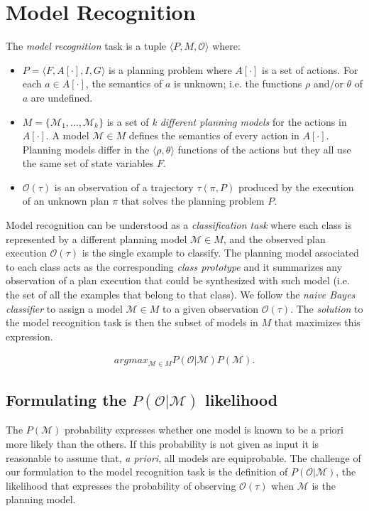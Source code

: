 \documentclass[letterpaper]{article} %
\newcommand{\tup}[1]{{\langle #1 \rangle}}
\begin{document}
\section{Model Recognition}
\label{sec:recognition}
The {\em model recognition} task is a tuple $\tup{P,M,\mathcal{O}}$ where:
\begin{itemize}
\item $P=\tup{F,A[\cdot],I,G}$ is a planning problem where $A[\cdot]$ is a set of actions. For each $a\in A[\cdot]$, the semantics of $a$ is unknown; i.e. the functions $\rho$ and/or $\theta$ of $a$ are undefined.
\item $M=\{\mathcal{M}_1,\ldots,\mathcal{M}_k\}$ is a set of {\em k different planning models} for the actions in $A[\cdot]$. A model $\mathcal{M}\in M$ defines the semantics of every action in $A[\cdot]$. Planning models differ in the $\tup{\rho,\theta}$ functions of the actions but they all use the same set of state variables $F$.
\item $\mathcal{O}(\tau)$ is an observation of a trajectory $\tau(\pi,P)$ produced by the execution of an unknown plan $\pi$ that solves the planning problem $P$.
\end{itemize}

Model recognition can be understood as a {\em classification task} where each class is represented by a different planning model $\mathcal{M}\in M$, and the observed plan execution $\mathcal{O}(\tau)$ is the single example to classify. The planning model associated to each class acts as the corresponding {\em class prototype} and it summarizes any observation of a plan execution that could be synthesized with such model (i.e. the set of all the examples that belong to that class). We follow the {\em naive Bayes classifier} to assign a model $\mathcal{M}\in M$ to a given observation $\mathcal{O}(\tau)$. The {\em solution} to the model recognition task is then the subset of models in $M$ that maximizes this expression.

\begin{align}
argmax_{\mathcal{M}\in M} P(\mathcal{O}|\mathcal{M}) P(\mathcal{M}).
\end{align}

\subsection{Formulating the $P(\mathcal{O}|\mathcal{M})$ likelihood}

The $P(\mathcal{M})$ probability expresses whether one model is known to be a priori more likely than the others. If this probability is not given as input it is reasonable to assume that, {\em a priori}, all models are equiprobable. The challenge of our formulation to the model recognition task is the definition of $P(\mathcal{O}|\mathcal{M})$, the likelihood that expresses the probability of observing $\mathcal{O}(\tau)$ when $\mathcal{M}$ is the planning model.
\end{document}

